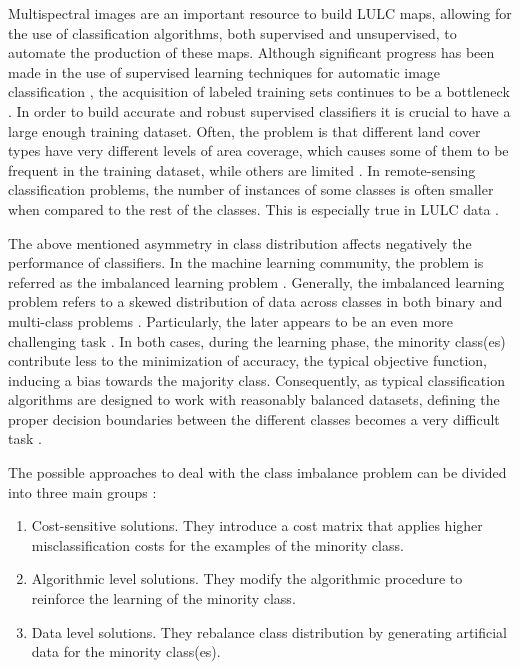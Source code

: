 \documentclass[parskip=full]{scrartcl}
\begin{document}
Multispectral images are an important resource to build LULC maps, allowing for
the use of classification algorithms, both supervised and unsupervised, to
automate the production of these maps. Although significant progress has been
made in the use of supervised learning techniques for automatic image
classification \cite{Tewkesbury2015}, the acquisition of labeled training sets
continues to be a bottleneck \cite{Rajan2008}. In order to build accurate and
robust supervised classifiers it is crucial to have a large enough training
dataset. Often, the problem is that different land cover types have very
different levels of area coverage, which causes some of them to be frequent in
the training dataset, while others are limited \cite{Feng2019}. In
remote-sensing classification problems, the number of instances of some classes
is often smaller when compared to the rest of the classes. This is especially
true in LULC data \cite{Williams2009, Cenggoro2018}.

The above mentioned asymmetry in class distribution affects negatively the
performance of classifiers. In the machine learning community, the problem is
referred as the imbalanced learning problem \cite{Chawla2004}. Generally, the
imbalanced learning problem refers to a skewed distribution of data across
classes in both binary and multi-class problems \cite{Abdi2016}. Particularly,
the later appears to be an even more challenging task \cite{Garcia2018}. In both
cases, during the learning phase, the minority class(es) contribute less to the
minimization of accuracy, the typical objective function, inducing a bias
towards the majority class. Consequently, as typical classification algorithms
are designed to work with reasonably balanced datasets, defining the proper
decision boundaries between the different classes becomes a very difficult task
\cite{Saez2016}.

The possible approaches to deal with the class imbalance problem can be divided into three main
groups \cite{Fernandez2013}:

\begin{enumerate}

	\item Cost-sensitive solutions. They introduce a cost matrix that applies
	higher misclassification costs for the examples of the minority class.

	\item Algorithmic level solutions. They modify the algorithmic procedure to
	reinforce the learning of the minority class.

	\item Data level solutions. They rebalance class distribution by generating
	artificial data for the minority class(es).

\end{enumerate}
\end{document}
